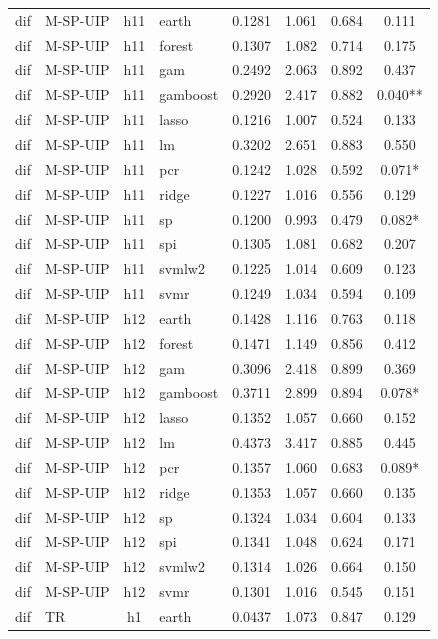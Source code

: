 \begin{ThreePartTable}
\begin{longtable}[t]{llclcccc}
\addlinespace
dif & M-SP-UIP & h11 & earth & 0.1281 & 1.061 & 0.684 & 0.111\\
dif & M-SP-UIP & h11 & forest & 0.1307 & 1.082 & 0.714 & 0.175\\
dif & M-SP-UIP & h11 & gam & 0.2492 & 2.063 & 0.892 & 0.437\\
dif & M-SP-UIP & h11 & gamboost & 0.2920 & 2.417 & 0.882 & 0.040**\\
dif & M-SP-UIP & h11 & lasso & 0.1216 & 1.007 & 0.524 & 0.133\\
dif & M-SP-UIP & h11 & lm & 0.3202 & 2.651 & 0.883 & 0.550\\
dif & M-SP-UIP & h11 & pcr & 0.1242 & 1.028 & 0.592 & 0.071*\\
dif & M-SP-UIP & h11 & ridge & 0.1227 & 1.016 & 0.556 & 0.129\\
dif & M-SP-UIP & h11 & sp & 0.1200 & 0.993 & 0.479 & 0.082*\\
dif & M-SP-UIP & h11 & spi & 0.1305 & 1.081 & 0.682 & 0.207\\
dif & M-SP-UIP & h11 & svmlw2 & 0.1225 & 1.014 & 0.609 & 0.123\\
dif & M-SP-UIP & h11 & svmr & 0.1249 & 1.034 & 0.594 & 0.109\\
\addlinespace
dif & M-SP-UIP & h12 & earth & 0.1428 & 1.116 & 0.763 & 0.118\\
dif & M-SP-UIP & h12 & forest & 0.1471 & 1.149 & 0.856 & 0.412\\
dif & M-SP-UIP & h12 & gam & 0.3096 & 2.418 & 0.899 & 0.369\\
dif & M-SP-UIP & h12 & gamboost & 0.3711 & 2.899 & 0.894 & 0.078*\\
dif & M-SP-UIP & h12 & lasso & 0.1352 & 1.057 & 0.660 & 0.152\\
dif & M-SP-UIP & h12 & lm & 0.4373 & 3.417 & 0.885 & 0.445\\
dif & M-SP-UIP & h12 & pcr & 0.1357 & 1.060 & 0.683 & 0.089*\\
dif & M-SP-UIP & h12 & ridge & 0.1353 & 1.057 & 0.660 & 0.135\\
dif & M-SP-UIP & h12 & sp & 0.1324 & 1.034 & 0.604 & 0.133\\
dif & M-SP-UIP & h12 & spi & 0.1341 & 1.048 & 0.624 & 0.171\\
dif & M-SP-UIP & h12 & svmlw2 & 0.1314 & 1.026 & 0.664 & 0.150\\
dif & M-SP-UIP & h12 & svmr & 0.1301 & 1.016 & 0.545 & 0.151\\
\addlinespace
dif & TR & h1 & earth & 0.0437 & 1.073 & 0.847 & 0.129\\

\end{longtable}
\end{ThreePartTable}
